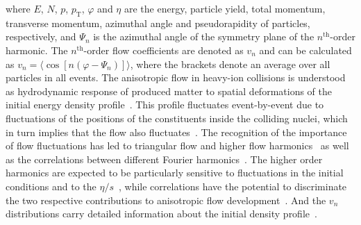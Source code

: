 \documentclass[ALICE,manyauthors]{cernphprep}
\begin{document}
\noindent where $E$, $N$, $p$, $p_{\mathrm{T}}$, $\varphi$ and $\eta$ are the energy, particle yield, total momentum, transverse momentum, azimuthal angle and pseudorapidity of particles, respectively, and $\Psi_n$ is the azimuthal angle of the symmetry plane of the $n^{\mathrm{th}}$-order harmonic. The $n^{\mathrm{th}}$-order flow coefficients are denoted as $v_n$ and can be calculated as $v_{n} = \langle{\cos[n(\varphi - \Psi_n)]}\rangle$, where the brackets denote an average over all particles in all events.
The anisotropic flow in heavy-ion collisions is understood as hydrodynamic response of produced matter to spatial deformations of the initial energy density profile~\cite{Floerchinger:2013tya}.
This profile fluctuates event-by-event due to fluctuations of the positions of the constituents inside the colliding nuclei, which in turn implies that the flow also fluctuates~\cite{Miller:2003kd,Alver:2006wh}.
The recognition of the importance of flow fluctuations has led to triangular flow and higher flow harmonics~\cite{Alver:2010gr,ALICE:2011ab} as well as the correlations between different Fourier harmonics~\cite{Niemi:2012aj,Aad:2014fla}.
The higher order harmonics are expected to be particularly sensitive to fluctuations in the initial conditions and to the $\eta/s$~\cite{Alver:2010dn,Luzum:2012wu}, while correlations have the potential to discriminate the two respective contributions to anisotropic flow development~\cite{Niemi:2012aj}.
And the $v_{n}$ distributions carry detailed information about the initial density profile~\cite{Renk:2014jja,Yan:2014nsa}.
\end{document}
